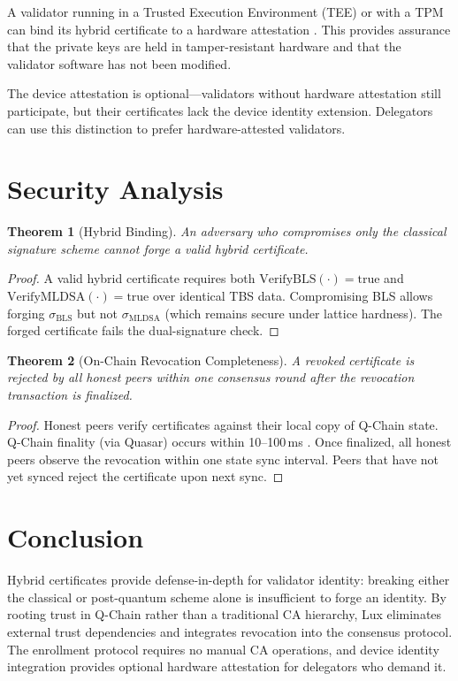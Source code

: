 \documentclass[11pt]{article}
\newtheorem{theorem}{Theorem}
\begin{document}
A validator running in a Trusted Execution Environment (TEE) or with a TPM can bind its hybrid certificate to a hardware attestation \cite{tee-mesh}. This provides assurance that the private keys are held in tamper-resistant hardware and that the validator software has not been modified.

The device attestation is optional---validators without hardware attestation still participate, but their certificates lack the device identity extension. Delegators can use this distinction to prefer hardware-attested validators.

\section{Security Analysis}

\begin{theorem}[Hybrid Binding]
An adversary who compromises only the classical signature scheme cannot forge a valid hybrid certificate.
\end{theorem}

\begin{proof}
A valid hybrid certificate requires both $\text{VerifyBLS}(\cdot) = \text{true}$ and $\text{VerifyMLDSA}(\cdot) = \text{true}$ over identical TBS data. Compromising BLS allows forging $\sigma_{\text{BLS}}$ but not $\sigma_{\text{MLDSA}}$ (which remains secure under lattice hardness). The forged certificate fails the dual-signature check.
\end{proof}

\begin{theorem}[On-Chain Revocation Completeness]
A revoked certificate is rejected by all honest peers within one consensus round after the revocation transaction is finalized.
\end{theorem}

\begin{proof}
Honest peers verify certificates against their local copy of Q-Chain state. Q-Chain finality (via Quasar) occurs within 10--100\,ms \cite{quasar}. Once finalized, all honest peers observe the revocation within one state sync interval. Peers that have not yet synced reject the certificate upon next sync.
\end{proof}

\section{Conclusion}

Hybrid certificates provide defense-in-depth for validator identity: breaking either the classical or post-quantum scheme alone is insufficient to forge an identity. By rooting trust in Q-Chain rather than a traditional CA hierarchy, Lux eliminates external trust dependencies and integrates revocation into the consensus protocol. The enrollment protocol requires no manual CA operations, and device identity integration provides optional hardware attestation for delegators who demand it.
\end{document}
